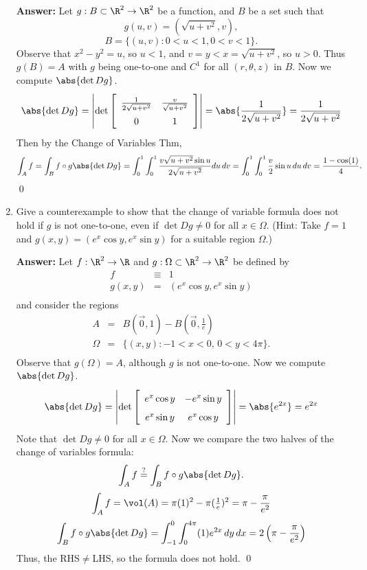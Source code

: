 \documentclass[letterpaper]{article}
\begin{document}
\begin{enumerate}
\textbf{Answer:} Let $g:B\subset\R^2\to\R^2$ be a function, and $B$ be a set such that 
$$g(u,v)=(\sqrt{u+v^2},v),$$
$$B=\{(u,v):0<u<1, 0<v<1\}.$$ 
Observe that $x^2-y^2=u$, so $u<1$, and $v=y<x=\sqrt{u+v^2}$, so $u>0$. Thus $g(B)=A$ with $g$ being one-to-one and $C^1$ for all $(r,\theta, z)$ in $B$. Now we compute $\abs{\det Dg}$. 
\[\abs{\det Dg}=
\left|\det\left[\def\arraystretch{1.618}
\begin{array}{cc}
\frac{1}{2\sqrt{u+v^2}} & \frac{v}{\sqrt{u+v^2}}\\
0&1\\
\end{array}
\right]\right|
= \abs{\frac{1}{2\sqrt{u+v^2}}} = \frac{1}{2\sqrt{u+v^2}}
\]
Then by the Change of Variables Thm, 
$$\int_A f=\int_B f\circ g \abs{\det Dg}=\int_0^1 \int_0^1 \frac{v\sqrt{u+v^2}\sin{u}}{2\sqrt{u+v^2}} du\, dv=\int_0^1 \int_0^1 \frac{v}{2}\sin u \, du \, dv = \frac{1-\cos(1)}{4}.$$\qed


\item Give a counterexample to show that the change of variable formula does not hold if $g$ is not one-to-one, even if $\det Dg\neq0$ for all $x\in\Omega$. (Hint: Take $f=1$ and $g(x,y) = (e^x\cos y, e^x\sin y)$ for a suitable region $\Omega$.)

\textbf{Answer:} Let $f:\R^2\to\R$ and $g:\Omega\subset\R^2\to\R^2$ be defined by 
\[\begin{array}{rcl}
f&\equiv&1\\
g(x,y) &=& (e^x\cos y, e^x\sin y)\\
\end{array}\]
and consider the regions 
\[\begin{array}{rcl}
A&=&B(\vec{0},1)-B(\vec{0},\frac{1}{e})\\
\Omega&=&\{(x,y):-1<x<0, \, 0<y<4\pi\}.\\
\end{array}\]
Observe that $g(\Omega)=A$, although $g$ is not one-to-one. Now we compute $\abs{\det Dg}$. 
\[\abs{\det Dg}=
\left|\det\left[
\begin{array}{cc}
e^x\cos y &  -e^x\sin y \\
e^x\sin y &  e^x\cos y \\
\end{array}
\right]\right|
= \abs{e^{2x}} = e^{2x}
\]
Note that $\det Dg\neq0$ for all $x\in\Omega$. Now we compare the two halves of the change of variables formula: 
$$\int_A f\stackrel{?}{=}\int_B f\circ g \abs{\det Dg}.$$
$$\int_A f = \vol(A) = \pi(1)^2-\pi(\tfrac{1}{e})^2 = \pi-\frac{\pi}{e^2}$$
$$\int_B f\circ g \abs{\det Dg} = \int_{-1}^0 \int_0^{4\pi} (1)e^{2x}\, dy\, dx = 2\left(\pi-\frac{\pi}{e^2}\right)$$
Thus, the RHS$\neq$LHS, so the formula does not hold. \qed


\end{enumerate}
\end{document}
